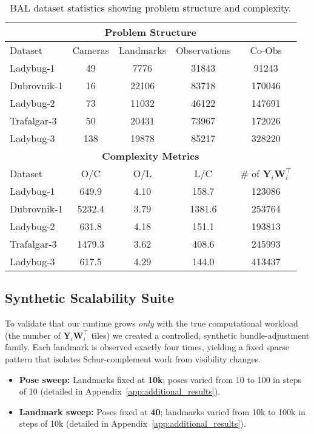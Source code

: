 \begin{table}[b]
\caption{BAL dataset statistics showing problem structure and complexity.}
\label{tab:exp_datasets}
\centering
\footnotesize
\begin{tabular}{@{}lcccc@{}}
\toprule
\multicolumn{5}{c}{\textbf{Problem Structure}} \\
\midrule
Dataset & Cameras & Landmarks & Observations & Co-Obs \\
\midrule
Ladybug‑1   & 49  & 7776  & 31843 & 91243 \\
Dubrovnik‑1 & 16  & 22106 & 83718 & 170046 \\
Ladybug‑2   & 73  & 11032 & 46122 & 147691 \\
Trafalgar‑3 & 50  & 20431 & 73967 & 172026 \\
Ladybug‑3   & 138 & 19878 & 85217 & 328220 \\
\midrule
\multicolumn{5}{c}{\textbf{Complexity Metrics}} \\
\midrule
Dataset & O/C & O/L & L/C & \# of $\mathbf Y_i\mathbf W_i^{\top}$ \\
\midrule
Ladybug‑1   & 649.9 & 4.10 & 158.7  & 123086 \\
Dubrovnik‑1 & 5232.4 & 3.79 & 1381.6 & 253764 \\
Ladybug‑2   & 631.8 & 4.18 & 151.1 & 193813 \\
Trafalgar‑3 & 1479.3 & 3.62 & 408.6 & 245993 \\
Ladybug‑3   & 617.5 & 4.29 & 144.0 & 413437 \\
\bottomrule
\end{tabular}
\end{table}

\subsection{Synthetic Scalability Suite}
\label{subsec:exp_synth}
To validate that our runtime grows \emph{only} with the true
computational workload (the number of $\mathbf Y_i\mathbf W_i^{\top}$
tiles) we created a controlled, synthetic bundle-adjustment family.
Each landmark is observed exactly four times, yielding a fixed sparse
pattern that isolates Schur-complement work from visibility changes.
\begin{itemize}
  \item \textbf{Pose sweep:} Landmarks fixed at \textbf{10k}; poses varied
        from 10 to 100 in steps of 10 (detailed in Appendix~\ref{app:additional_results}).
  \item \textbf{Landmark sweep:} Poses fixed at \textbf{40}; landmarks
        varied from 10k to 100k in steps of 10k
        (detailed in Appendix~\ref{app:additional_results}).
\end{itemize}


